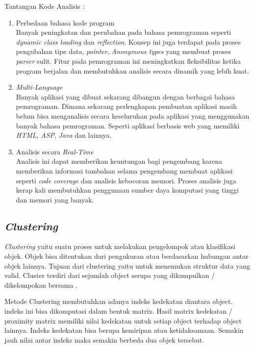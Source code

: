 Tantangan Kode Analisis \cite{208}:
\begin{enumerate}[leftmargin=1.3cm]
	\item Perbedaan bahasa kode program\\
	Banyak peningkatan dan perubahan pada bahasa pemrograman seperti \textit{dynamic class loading} dan \textit{reflection}. Konsep ini juga terdapat pada proses pengubahan tipe data, \textit{pointer}, \textit{Anonymous types} yang membuat proses \textit{parser} sulit. Fitur pada pemrograman ini meningkatkan fleksibilitas ketika program berjalan dan membutuhkan analisis secara dinamik yang lebih kuat.
	\item \textit{Multi-Language}\\
	Banyak aplikasi yang dibuat sekarang dibangun dengan berbagai bahasa pemrograman. Dimana sekarang perlengkapan pembuatan aplikasi masih belum bisa menganalisis secara keseluruhan pada aplikasi yang menggunakan banyak bahasa pemrograman. Seperti aplikasi berbasis web yang memiliki \textit{HTML}, \textit{ASP}, \textit{Java} dan lainnya.
	\item Analisis secara \textit{Real-Time}\\
	Analisis ini dapat memberikan keuntungan bagi pengembang karena memberikan informasi tambahan selama pengembang membuat aplikasi seperti \textit{code coverage} dan analisis kebocoran memori. Proses analisis juga kerap kali membutuhkan penggunaan sumber daya komputasi yang tinggi dan memori yang banyak.\\
\end{enumerate}

\subsection{\textit{Clustering}}
\textit{Clustering} yaitu suatu proses untuk melakukan pengelompok atau klasifikasi objek. Objek bisa ditentukan dari pengukuran atau berdasarkan hubungan antar objek lainnya. Tujuan dari clustering yaitu untuk  menemukan struktur data yang valid. Cluster terdiri dari sejumlah object serupa yang dikumpulkan / dikelompokan bersama \cite{2C9}.

Metode Clustering membutuhkan adanya indeks kedekatan diantara object. indeks ini bisa dikomputasi dalam bentuk matrix. Hasil matrix kedekatan / proximity matrix memiliki nilai kedekatan untuk setiap object terhadap object lainnya. Indeks kedekatan bisa berupa kemiripan atau ketidaksamaan. Semakin jauh nilai antar indeks maka semakin berbeda dua objek tersebut\cite{2C9}.

